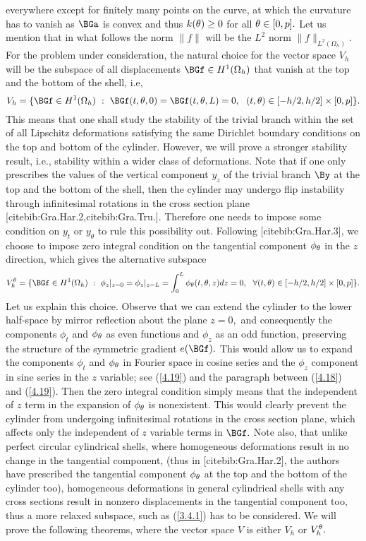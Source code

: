 everywhere except for finitely many points on the curve, at which the curvature has to vanish as $\BGa$ is convex and thus $k(\theta)\geq 0$ for all $\theta\in [0,p].$ 
Let us mention that in what follows the norm $\|f\|$ will be the $L^2$ norm $\|f\|_{L^2(\Omega_h)}.$ For the problem under consideration, the natural choice for the vector space $V_h$ will be the subspace of all displacements $\BGf\in H^1(\Omega_h)$ that vanish at the top and the bottom of the shell, i.e,  
\begin{equation}
\label{3.4}
V_h=\{\BGf\in H^1(\Omega_h) \ : \ \BGf(t,\Gth,0)=\BGf(t,\Gth,L)=0, \ \ (t,\Gth)\in [-h/2,h/2]\times [0,p] \}.
\end{equation}
This means that one shall study the stability of the trivial branch within the set of all Lipschitz deformations satisfying the same Dirichlet boundary conditions on the top and bottom of the cylinder. However, we will prove a stronger stability result, i.e., stability within a wider class of deformations. Note that if one only prescribes the values of the vertical component $y_z$ of the trivial branch $\By$ at the top and the bottom of the shell, then the cylinder may undergo flip instability through infinitesimal rotations in the cross section plane [cite{bib:Gra.Har.2},cite{bib:Gra.Tru.}]. Therefore one needs to impose some condition on $y_t$ or $y_\theta$ to rule this possibility out. Following [cite{bib:Gra.Har.3}], we choose to impose zero integral condition on the tangential component $\phi_\theta$ in the $z$ direction, which gives the alternative subspace
\begin{equation}
\label{3.4.1}
V_h^\Gth=\{\BGf\in H^1(\Omega_h) \ : \  \phi_z|_{z=0}=\phi_z|_{z=L}=\int_0^L\phi_\Gth(t,\Gth,z)dz=0, \ \ \forall (t,\Gth)\in [-h/2,h/2]\times [0,p] \}.
\end{equation}
Let us explain this choice. Observe that we can extend the cylinder to the lower half-space by mirror reflection about the plane $z=0,$ and consequently the components $\phi_t$ and $\phi_\theta$ as even functions and $\phi_z$ as an odd function, preserving the structure of the symmetric gradient $e(\BGf).$ This would allow us to expand the components $\phi_t$ and $\phi_\theta$ in Fourier space in cosine series and the $\phi_z$ component in sine series in the $z$ variable; see (\ref{4.19}) and the paragraph between (\ref{4.18}) and (\ref{4.19}). Then the zero integral condition simply means that the independent of $z$ term in the expansion of $\phi_\theta$ is nonexistent. This would clearly prevent the cylinder from undergoing infinitesimal rotations in the cross section plane, which affects only the independent of $z$ variable terms in $\BGf.$ Note also, that unlike perfect circular cylindrical shells, where homogeneous deformations result in no change in the tangential component, (thus in [cite{bib:Gra.Har.2}], the authors have prescribed the tangential component $\phi_\theta$ at the top and the bottom of the cylinder too), homogeneous deformations in general cylindrical shells with any cross sections result in nonzero displacements in the tangential component too, thus a more relaxed subspace, such as (\ref{3.4.1}) has to be considered. We will prove the following theorems, where the vector space $V$ is either $V_h$ or $V_h^\theta.$



